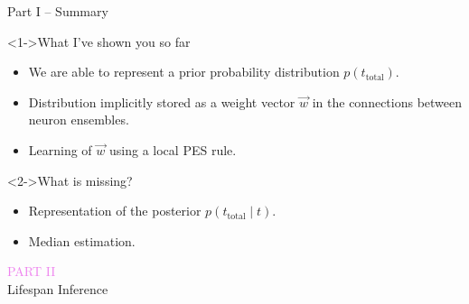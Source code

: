 \documentclass[aspectratio=169]{beamer}
\begin{document}
\begin{frame}{Part I -- Summary}
	\begin{block}<1->{What I've shown you so far\textellipsis}
	\begin{itemize}
		\item We are able to represent a prior probability distribution $p(t_\mathrm{total})$.
		\item Distribution implicitly stored as a weight vector $\vec w$ in the connections between neuron ensembles.
		\item Learning of $\vec w$ using a local PES rule.
	\end{itemize}
	\end{block}
	\begin{block}<2->{What is missing?}
	\begin{itemize}
		\item Representation of the posterior $p(t_\mathrm{total} \mid t)$.
		\item Median estimation.
	\end{itemize}
	\end{block}	
\end{frame}

\begin{frame}
	\centering
	{\Large\textcolor{violet}{\textsc{PART II}}}\\
	\huge Lifespan Inference
\end{frame}
\end{document}
